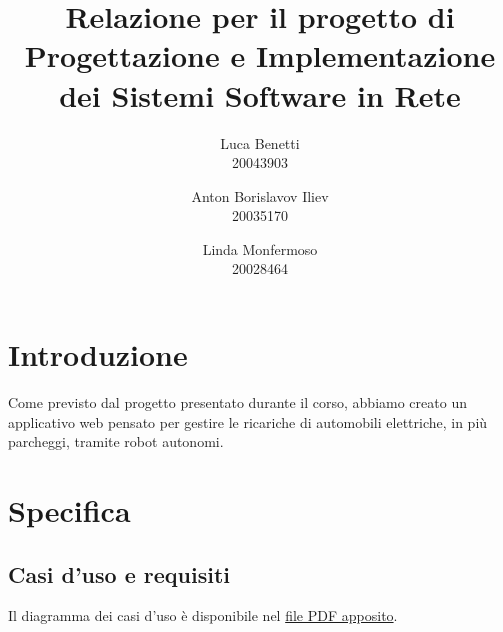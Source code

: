\documentclass{article}
\title{Relazione per il progetto di Progettazione e Implementazione dei Sistemi Software in Rete}
\author{
  Luca Benetti\\
  20043903
  \and
  Anton Borislavov Iliev\\
  20035170
  \and
  Linda Monfermoso\\
  20028464
}
\begin{document}
\maketitle

\section{Introduzione}
Come previsto dal progetto presentato durante il corso, abbiamo creato un applicativo web pensato per gestire le ricariche di automobili elettriche, in più parcheggi, tramite robot autonomi.
\section{Specifica}
\subsection{Casi d'uso e requisiti}
Il diagramma dei casi d'uso è disponibile nel \href{run:./casi d'uso.pdf}{file PDF apposito}.
\end{document}
